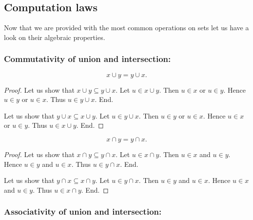 \documentclass[../../set-theory.tex]{subfiles}
\begin{document}
  \subsection{Computation laws}

  \noindent Now that we are provided with the most common operations on sets
  let us have a look on their algebraic properties.

  \subsubsection*{Commutativity of union and intersection:}

  \begin{forthel}
    \begin{proposition}\label{SetTheory_01_01_830899}
      \[ x \cup y = y \cup x. \]
    \end{proposition}
    \begin{proof}
      Let us show that $x \cup y \subseteq y \cup x$.
        Let $u \in x \cup y$.
        Then $u \in x$ or $u \in y$.
        Hence $u \in y$ or $u \in x$.
        Thus $u \in y \cup x$.
      End.

      Let us show that $y \cup x \subseteq x \cup y$.
        Let $u \in y \cup x$.
        Then $u \in y$ or $u \in x$.
        Hence $u \in x$ or $u \in y$.
        Thus $u \in x \cup y$.
      End.
    \end{proof}

    \begin{proposition}\label{SetTheory_01_01_728823}
      \[ x \cap y = y \cap x. \]
    \end{proposition}
    \begin{proof}
      Let us show that $x \cap y \subseteq y \cap x$.
        Let $u \in x \cap y$.
        Then $u \in x$ and $u \in y$.
        Hence $u \in y$ and $u \in x$.
        Thus $u \in y \cap x$.
      End.

      Let us show that $y \cap x \subseteq x \cap y$.
        Let $u \in y \cap x$.
        Then $u \in y$ and $u \in x$.
        Hence $u \in x$ and $u \in y$.
        Thus $u \in x \cap y$.
      End.
    \end{proof}
  \end{forthel}


  \subsubsection*{Associativity of union and intersection:}
\end{document}
